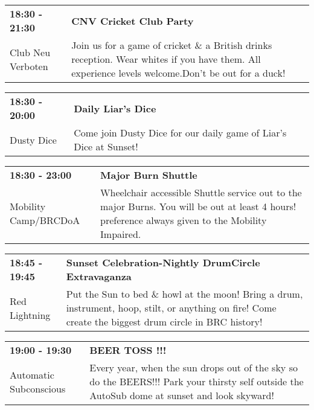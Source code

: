 \begin{tabular}{ p{1in} p{2.2in} }
    \textbf{18:30 - 21:30} & \textbf{CNV Cricket Club Party} \\
    Club Neu Verboten \newline  & Join us for a game of cricket \& a British drinks reception. Wear whites if you have them. All experience levels welcome.Don't be out for a duck! \\
    \hline 
\end{tabular}
    
\begin{tabular}{ p{1in} p{2.2in} }
    \textbf{18:30 - 20:00} & \textbf{Daily Liar's Dice} \\
    Dusty Dice \newline  & Come join Dusty Dice for our daily game of Liar's Dice at Sunset! \\
    \hline 
\end{tabular}
    
\begin{tabular}{ p{1in} p{2.2in} }
    \textbf{18:30 - 23:00} & \textbf{Major Burn Shuttle} \\
    Mobility Camp/BRCDoA \newline  & Wheelchair accessible Shuttle service out to the major Burns. You will be out at least 4 hours! preference always given to the Mobility Impaired. \\
    \hline 
\end{tabular}
    
\begin{tabular}{ p{1in} p{2.2in} }
    \textbf{18:45 - 19:45} & \textbf{Sunset Celebration-Nightly DrumCircle Extravaganza} \\
    Red Lightning \newline  & Put the Sun to bed \& howl at the moon! Bring a drum, instrument, hoop, stilt, or anything on fire! Come create the biggest drum circle in BRC history! \\
    \hline 
\end{tabular}
    
\begin{tabular}{ p{1in} p{2.2in} }
    \textbf{19:00 - 19:30} & \textbf{BEER TOSS !!!} \\
    Automatic Subconscious \newline  & Every year, when the sun drops out of the sky so do the BEERS!!! Park your thirsty self outside the AutoSub dome at sunset and look skyward! \\
    \hline 
\end{tabular}
    
